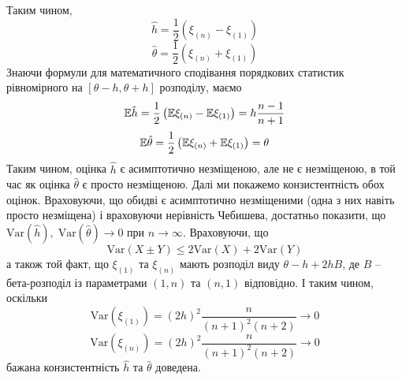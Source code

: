 \documentclass[12pt]{article} %
\newcommand{\Var}{\mbox{Var}}
\begin{document}
	Таким чином, \[\hat{h}=\frac{1}{2}(\xi_{(n)}-\xi_{(1)})\]
	\[\hat{\theta}=\frac{1}{2}(\xi_{(n)}+\xi_{(1)})\]
	Знаючи формули для математичного сподівання порядкових статистик рівномірного на $[\theta-h,\theta+h]$ розподілу, маємо
	\[\mathbb{E}\hat{h}=\frac{1}{2}\left(\mathbb{E}\xi_{(n)}-\mathbb{E}\xi_{(1)}\right)=h\frac{n-1}{n+1}\]
	\[\mathbb{E}\hat{\theta}=\frac{1}{2}\left(\mathbb{E}\xi_{(n)}+\mathbb{E}\xi_{(1)}\right)=\theta\]
	Таким чином, оцінка $\hat{h}$ є асимптотично незміщеною, але не є незміщеною, в той час як оцінка $\hat{\theta}$ є просто незміщеною. Далі
	ми покажемо конзистентність обох оцінок. Враховуючи, що обидві є асимптотично незміщеними (одна з них навіть просто незміщена) і враховуючи
	нерівність Чебишева, достатньо показити, що $\Var(\hat{h}),\;\Var({\hat{\theta}})\to0$ при $n\to\infty$.
	Враховуючи, що
	\[\Var(X\pm Y)\leq2\Var(X)+2\Var(Y)\]
	а також той факт, що $\xi_{(1)}$ та $\xi_{(n)}$ мають розподіл виду $\theta-h+2hB$, де $B$ -- бета-розподіл із параметрами $(1,n)$ та $(n,1)$
	відповідно. І таким чином, оскільки
	\[\Var(\xi_{(1)})=(2h)^2\frac{n}{(n+1)^2(n+2)}\to0\]
	\[\Var(\xi_{(n)})=(2h)^2\frac{n}{(n+1)^2(n+2)}\to0\]
	бажана конзистентність $\hat{h}$ та $\hat{\theta}$ доведена.
\end{document}
